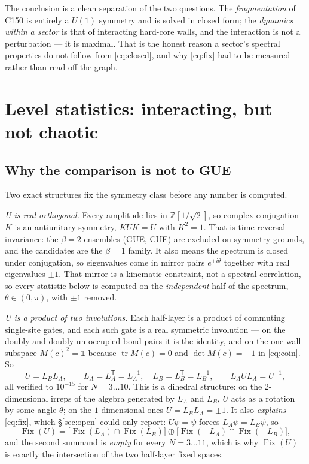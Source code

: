 \documentclass[11pt]{article}
\newcommand{\Fix}{\operatorname{Fix}}
\theoremstyle{plain}
\theoremstyle{definition}
\begin{document}
The conclusion is a clean separation of the two questions. The
\emph{fragmentation} of C150 is entirely a $U(1)$ symmetry and is solved in
closed form; the \emph{dynamics within a sector} is that of interacting hard-core
walls, and the interaction is not a perturbation --- it is maximal. That is the
honest reason a sector's spectral properties do not follow from
\eqref{eq:closed}, and why \eqref{eq:fix} had to be measured rather than read off
the graph.

\section{Level statistics: interacting, but not chaotic}
\label{sec:levels}

\subsection{Why the comparison is not to GUE}

Two exact structures fix the symmetry class before any number is computed.

\emph{U is real orthogonal.} Every amplitude lies in $\mathbb{Z}[1/\sqrt2]$, so
complex conjugation $K$ is an antiunitary symmetry, $KUK = U$ with $K^2 = 1$.
That is time-reversal invariance: the $\beta=2$ ensembles (GUE, CUE) are excluded
on symmetry grounds, and the candidates are the $\beta=1$ family. It also means
the spectrum is closed under conjugation, so eigenvalues come in mirror pairs
$e^{\pm i\theta}$ together with real eigenvalues $\pm1$. That mirror is a
kinematic constraint, not a spectral correlation, so every statistic below is
computed on the \emph{independent} half of the spectrum, $\theta\in(0,\pi)$, with
$\pm1$ removed.

\emph{U is a product of two involutions.} Each half-layer is a product of
commuting single-site gates, and each such gate is a real symmetric involution
--- on the doubly and doubly-un-occupied bond pairs it is the identity, and on
the one-wall subspace $M(c)^2 = \mathbb{1}$ because $\operatorname{tr}M(c) = 0$
and $\det M(c) = -1$ in \eqref{eq:coin}. So
\begin{equation}
  U = L_BL_A, \qquad L_A = L_A^{\mathsf T} = L_A^{-1},
  \quad L_B = L_B^{\mathsf T} = L_B^{-1},
  \qquad L_AUL_A = U^{-1},
  \label{eq:invol}
\end{equation}
all verified to $10^{-15}$ for $N=3\ldots10$. This is a dihedral
structure: on the $2$-dimensional irreps of the algebra generated by $L_A$ and
$L_B$, $U$ acts as a rotation by some angle $\theta$; on the $1$-dimensional ones
$U = L_BL_A = \pm1$. It also \emph{explains} \eqref{eq:fix}, which \S\ref{sec:open}
could only report: $U\psi = \psi$ forces $L_A\psi = L_B\psi$, so
\begin{equation}
  \Fix(U) = \bigl[\Fix(L_A)\cap\Fix(L_B)\bigr] \oplus
            \bigl[\Fix(-L_A)\cap\Fix(-L_B)\bigr],
\end{equation}
and the second summand is \emph{empty} for every $N=3\ldots11$, which is why
$\Fix(U)$ is exactly the intersection of the two half-layer fixed spaces.
\end{document}
